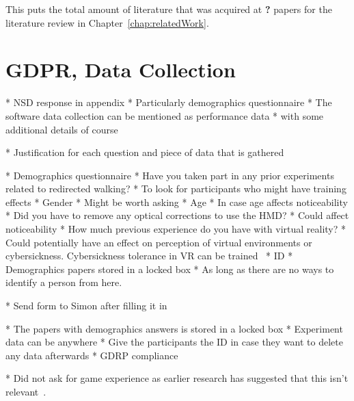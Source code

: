 This puts the total amount of literature that was acquired at \textbf{?} papers for the literature review in Chapter~\ref{chap:relatedWork}.

\section{GDPR, Data Collection}
* NSD response in appendix
* Particularly demographics questionnaire
* The software data collection can be mentioned as performance data
   * with some additional details of course
   
* Justification for each question and piece of data that is gathered

* Demographics questionnaire
   * Have you taken part in any prior experiments related to redirected walking?
      * To look for participants who might have training effects 
   * Gender
      * Might be worth asking
   * Age
      * In case age affects noticeability
   * Did you have to remove any optical corrections to use the HMD?
      * Could affect noticeability
   * How much previous experience do you have with virtual reality?
      * Could potentially have an effect on perception of virtual environments or cybersickness. Cybersickness tolerance in VR can be trained~\cite{hildebrandt2018get}
   * ID
      * Demographics papers stored in a locked box
   * As long as there are no ways to identify a person from here. 

* Send form to Simon after filling it in

* The papers with demographics answers is stored in a locked box 
* Experiment data can be anywhere
* Give the participants the ID in case they want to delete any data afterwards
   * GDRP compliance

* Did not ask for game experience as earlier research has suggested that this isn't relevant~\cite{nguyen2018individual}.